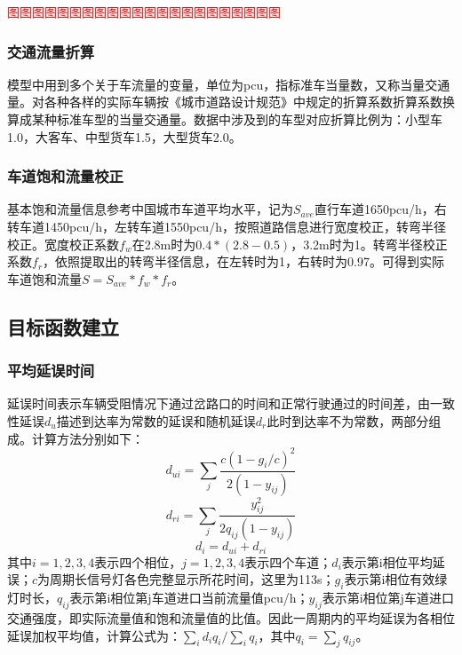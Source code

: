 \textcolor{red}{图图图图图图图图图图图图图图图图图图图图图图}

\subsubsection{交通流量折算}
模型中用到多个关于车流量的变量，单位为pcu，指标准车当量数，又称当量交通量。对各种各样的实际车辆按《城市道路设计规范》中规定的折算系数折算系数换算成某种标准车型的当量交通量。数据中涉及到的车型对应折算比例为：小型车1.0，大客车、中型货车1.5，大型货车2.0。

\subsubsection{车道饱和流量校正}
基本饱和流量信息参考中国城市车道平均水平，记为$S_{ave}$直行车道1650pcu/h，右转车道1450pcu/h，左转车道1550pcu/h，按照道路信息进行宽度校正，转弯半径校正。宽度校正系数$f_w$在2.8m时为$0.4*(2.8-0.5)$，3.2m时为1。转弯半径校正系数$f_r$，依照提取出的转弯半径信息，在左转时为1，右转时为0.97。可得到实际车道饱和流量$S=S_{ave}*f_w*f_r$。

\subsection{目标函数建立}

\subsubsection{平均延误时间}
延误时间表示车辆受阻情况下通过岔路口的时间和正常行驶通过的时间差，由一致性延误$d_{u}$描述到达率为常数的延误和随机延误$d_{r}$此时到达率不为常数，两部分组成。计算方法分别如下：
\begin{equation}
    d_{ui}=\sum_{j} \frac{c\left(1-g_{i} / c\right)^{2}}{2\left(1-y_{i j}\right)}
\end{equation}
\begin{equation}
    d_{ri}=\sum_{j} \frac{y_{i j}^{2}}{2 q_{i j}\left(1-y_{i j}\right)}
\end{equation}
\begin{equation}
    d_{i}=d_{ui}+d_{ri}
\end{equation}
其中$i = 1,2,3,4$表示四个相位，$j=1,2,3,4$表示四个车道；$d_i$表示第i相位平均延误；$c$为周期长信号灯各色完整显示所花时间，这里为113s；$g_i$表示第i相位有效绿灯时长，$q_{ij}$表示第i相位第j车道进口当前流量值pcu/h；$y_{ij}$表示第i相位第j车道进口交通强度，即实际流量值和饱和流量值的比值。因此一周期内的平均延误为各相位延误加权平均值，计算公式为：$\sum_{i} d_i q_{i} /\sum_{i} q_{i}$，其中$q_{i}=\sum_{j} q_{ij}$。

